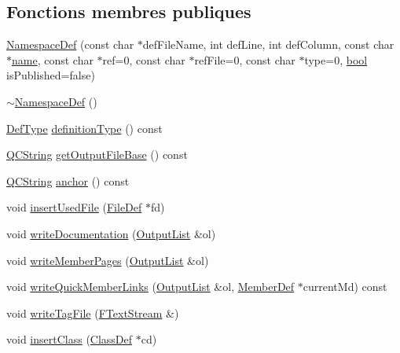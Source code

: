 \subsection*{Fonctions membres publiques}
\begin{DoxyCompactItemize}
\item 
\hyperlink{class_namespace_def_a6099f6929aae4a799a89c4d0ba1b58fe}{Namespace\+Def} (const char $\ast$def\+File\+Name, int def\+Line, int def\+Column, const char $\ast$\hyperlink{class_definition_a99481361779e85f0c1556709de7d9e5b}{name}, const char $\ast$ref=0, const char $\ast$ref\+File=0, const char $\ast$type=0, \hyperlink{qglobal_8h_a1062901a7428fdd9c7f180f5e01ea056}{bool} is\+Published=false)
\item 
\hyperlink{class_namespace_def_a5b6d5f70d156dc6fad9b367239d77af6}{$\sim$\+Namespace\+Def} ()
\item 
\hyperlink{class_definition_intf_ada60114bc621669dd8c19edfc6421766}{Def\+Type} \hyperlink{class_namespace_def_ad923f32e61db83c49e75fed87761eec7}{definition\+Type} () const 
\item 
\hyperlink{class_q_c_string}{Q\+C\+String} \hyperlink{class_namespace_def_a3c7ccf4e29b4e6bfeaf2b17109f80f57}{get\+Output\+File\+Base} () const 
\item 
\hyperlink{class_q_c_string}{Q\+C\+String} \hyperlink{class_namespace_def_af0f323a5fef66c55810711c1440870a2}{anchor} () const 
\item 
void \hyperlink{class_namespace_def_adeda08d571157ba904c4511938670ab8}{insert\+Used\+File} (\hyperlink{class_file_def}{File\+Def} $\ast$fd)
\item 
void \hyperlink{class_namespace_def_a77eaae74016fabfb810e241fc4b4acc3}{write\+Documentation} (\hyperlink{class_output_list}{Output\+List} \&ol)
\item 
void \hyperlink{class_namespace_def_a8e0fac3de9d8993493e583dd857117ab}{write\+Member\+Pages} (\hyperlink{class_output_list}{Output\+List} \&ol)
\item 
void \hyperlink{class_namespace_def_a1e04ceb7c8f5c97cb94bb29ed7d15633}{write\+Quick\+Member\+Links} (\hyperlink{class_output_list}{Output\+List} \&ol, \hyperlink{class_member_def}{Member\+Def} $\ast$current\+Md) const 
\item 
void \hyperlink{class_namespace_def_ab49c635f18b0326ea693c2e53565fec5}{write\+Tag\+File} (\hyperlink{class_f_text_stream}{F\+Text\+Stream} \&)
\item 
void \hyperlink{class_namespace_def_a0ef84054d4f877e7d0259cbbdbcc357b}{insert\+Class} (\hyperlink{class_class_def}{Class\+Def} $\ast$cd)

\end{DoxyCompactItemize}
